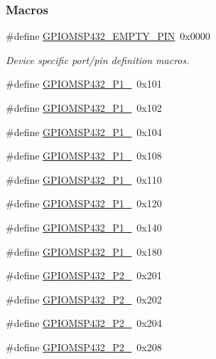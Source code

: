 \subsubsection*{Macros}
\begin{DoxyCompactItemize}
\item 
\#define \hyperlink{_g_p_i_o_m_s_p432_8h_abd739123f242bc7f1d3a609e79f44a63}{G\+P\+I\+O\+M\+S\+P432\+\_\+\+E\+M\+P\+T\+Y\+\_\+\+P\+I\+N}~0x0000
\begin{DoxyCompactList}\small\item\em Device specific port/pin definition macros. \end{DoxyCompactList}\item 
\#define \hyperlink{_g_p_i_o_m_s_p432_8h_a6bbc131a3dceefc93680e74ac89113a1}{G\+P\+I\+O\+M\+S\+P432\+\_\+\+P1\+\_}~0x101
\item 
\#define \hyperlink{_g_p_i_o_m_s_p432_8h_a2e016b6a957dbe75189b88cf6b46dab7}{G\+P\+I\+O\+M\+S\+P432\+\_\+\+P1\+\_}~0x102
\item 
\#define \hyperlink{_g_p_i_o_m_s_p432_8h_a521980cd8a745593d622442e5750a2a0}{G\+P\+I\+O\+M\+S\+P432\+\_\+\+P1\+\_}~0x104
\item 
\#define \hyperlink{_g_p_i_o_m_s_p432_8h_ae46cf7973822704db06e17a39aa3a536}{G\+P\+I\+O\+M\+S\+P432\+\_\+\+P1\+\_}~0x108
\item 
\#define \hyperlink{_g_p_i_o_m_s_p432_8h_ab0b7b4d603fb7af7e822a853e0fb2c7a}{G\+P\+I\+O\+M\+S\+P432\+\_\+\+P1\+\_}~0x110
\item 
\#define \hyperlink{_g_p_i_o_m_s_p432_8h_a2b8d1724003903b8bb5d83bb6c18fcfa}{G\+P\+I\+O\+M\+S\+P432\+\_\+\+P1\+\_}~0x120
\item 
\#define \hyperlink{_g_p_i_o_m_s_p432_8h_ae40941f913bc66fbdccc667ad81d93aa}{G\+P\+I\+O\+M\+S\+P432\+\_\+\+P1\+\_}~0x140
\item 
\#define \hyperlink{_g_p_i_o_m_s_p432_8h_af32d374daa214a7569859882171c571b}{G\+P\+I\+O\+M\+S\+P432\+\_\+\+P1\+\_}~0x180
\item 
\#define \hyperlink{_g_p_i_o_m_s_p432_8h_a8eda2dfaa14273b3dd367e32e84bb256}{G\+P\+I\+O\+M\+S\+P432\+\_\+\+P2\+\_}~0x201
\item 
\#define \hyperlink{_g_p_i_o_m_s_p432_8h_a176c08335f37b6acaec7e0609588ddf4}{G\+P\+I\+O\+M\+S\+P432\+\_\+\+P2\+\_}~0x202
\item 
\#define \hyperlink{_g_p_i_o_m_s_p432_8h_ac2790c8a10e1f54090f18b409ef565d9}{G\+P\+I\+O\+M\+S\+P432\+\_\+\+P2\+\_}~0x204
\item 
\#define \hyperlink{_g_p_i_o_m_s_p432_8h_a1b7cde6097b902078c080e28d44f7d2a}{G\+P\+I\+O\+M\+S\+P432\+\_\+\+P2\+\_}~0x208

\end{DoxyCompactItemize}
